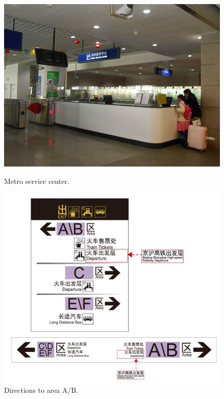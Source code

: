 \documentclass[11pt]{article}
\begin{document}
 \begin{figure}[!h]
	\begin{minipage}[t]{.5\textwidth}
     	\centering
        	\includegraphics{image024.jpg}
		\caption{Metro service center.\label{pic10}}
	\end{minipage}%
     \begin{minipage}[t]{.5\textwidth}
         \centering
         \includegraphics[scale=0.5]{image028.jpg}
		\caption{Directions to area A\slash B.\label{pic11}}
    \end{minipage}%
 \end{figure}
 
\end{document}
